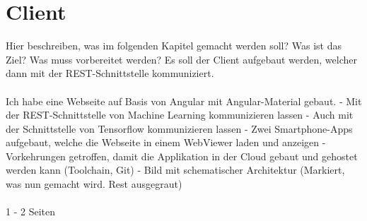 \chapter{Client}
Hier beschreiben, was im folgenden Kapitel gemacht werden soll? Was ist das Ziel? Was muss vorbereitet werden?
Es soll der Client aufgebaut werden, welcher dann mit der REST-Schnittstelle kommuniziert.
\\ \\
Ich habe eine Webseite auf Basis von Angular mit Angular-Material gebaut. - Mit der REST-Schnittstelle von Machine Learning
kommunizieren lassen - Auch mit der Schnittstelle von Tensorflow kommunizieren lassen - Zwei Smartphone-Apps aufgebaut,
welche die Webseite in einem WebViewer laden und anzeigen - Vorkehrungen getroffen, damit die Applikation in der Cloud
gebaut und gehostet werden kann (Toolchain, Git) - Bild mit schematischer Architektur (Markiert, was nun gemacht wird.
Rest ausgegraut)
\\ \\
1 - 2 Seiten